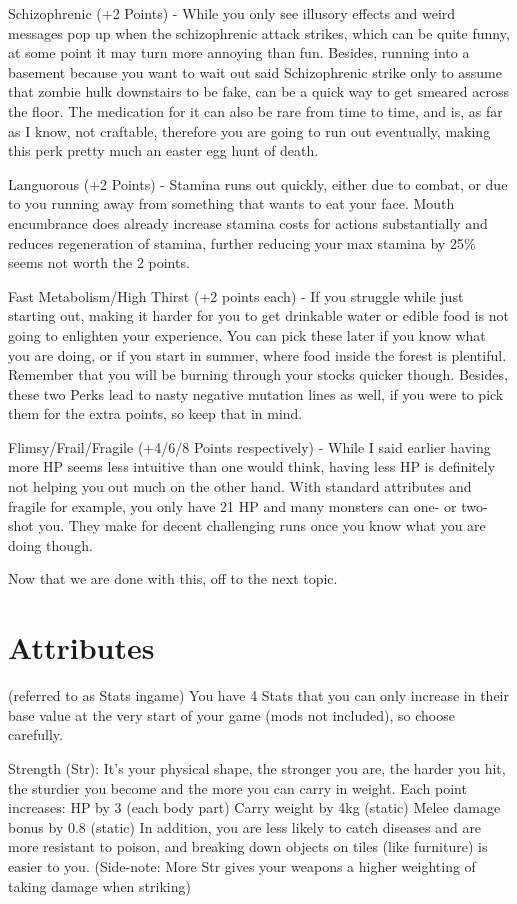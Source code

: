 \documentclass[11pt]{report}
\begin{document}
Schizophrenic (+2 Points) - While you only see illusory effects and weird messages pop up when the schizophrenic attack strikes, which can be quite funny, at some point it may turn more annoying than fun. Besides, running into a basement because you want to wait out said Schizophrenic strike only to assume that zombie hulk downstairs to be fake, can be a quick way to get smeared across the floor. The medication for it can also be rare from time to time, and is, as far as I know, not craftable, therefore you are going to run out eventually, making this perk pretty much an easter egg hunt of death.

Languorous (+2 Points) - Stamina runs out quickly, either due to combat, or due to you running away from something that wants to eat your face. Mouth encumbrance does already increase stamina costs for actions substantially and reduces regeneration of stamina, further reducing your max stamina by 25\% seems not worth the 2 points.

Fast Metabolism/High Thirst (+2 points each) - If you struggle while just starting out, making it harder for you to get drinkable water or edible food is not going to enlighten your experience. You can pick these later if you know what you are doing, or if you start in summer, where food inside the forest is plentiful. Remember that you will be burning through your stocks quicker though.
Besides, these two Perks lead to nasty negative mutation lines as well, if you were to pick them for the extra points, so keep that in mind.

Flimsy/Frail/Fragile (+4/6/8 Points respectively) - While I said earlier having more HP seems less intuitive than one would think, having less HP is definitely not helping you out much on the other hand. With standard attributes and fragile for example, you only have 21 HP and many monsters can one- or two-shot you. They make for decent challenging runs once you know what you are doing though.

Now that we are done with this, off to the next topic.

\section{Attributes}

(referred to as Stats ingame)
You have 4 Stats that you can only increase in their base value at the very start of your game (mods not included), so choose carefully.

Strength (Str): It's your physical shape, the stronger you are, the harder you hit, the sturdier you become and the more you can carry in weight. Each point increases:
HP by 3 (each body part)
Carry weight by 4kg (static)
Melee damage bonus by 0.8 (static)
In addition, you are less likely to catch diseases and are more resistant to poison, and breaking down objects on tiles (like furniture) is easier to you.
(Side-note: More Str gives your weapons a higher weighting of taking damage when striking)
\end{document}
